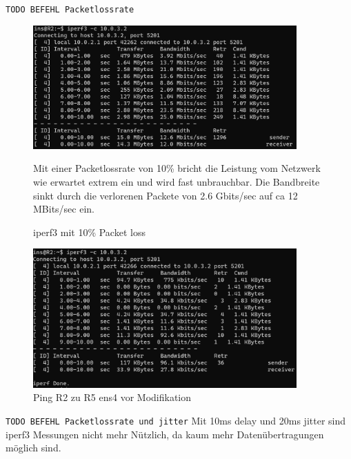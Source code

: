 \documentclass[11pt,titlepage]{article}
\begin{document}
\lstinline!TODO BEFEHL Packetlossrate!

  \begin{figure}[H]
  	\begin{center}
  		\includegraphics[width=0.90\textwidth]{"images/iperf3 R2 10 packet loss"}
  		\caption{iperf3 mit 10\% Packet loss}
  		\label{fig:iperf3-R2-10-packet-loss}
  	\end{center}
  Mit einer Packetlossrate von 10\% bricht die Leistung vom Netzwerk wie erwartet extrem ein und wird fast unbrauchbar. Die Bandbreite sinkt durch die verlorenen Packete von 2.6 Gbits/sec auf ca 12 MBits/sec ein.
  \end{figure}
  \begin{figure}[H]
  	\begin{center}
  		\includegraphics[width=0.90\textwidth]{"images/iperf3 R2 10ms delay 20ms jitter"}
  		\caption{Ping R2 zu R5 ens4 vor Modifikation}
  		\label{fig:iperf3-R2-10ms-delay-20ms-jitter}
  	\end{center}
  \end{figure}
\lstinline!TODO BEFEHL Packetlossrate und jitter!
  Mit 10ms delay und 20ms jitter sind iperf3 Messungen nicht mehr Nützlich, da kaum mehr Datenübertragungen möglich sind.
\end{document}
